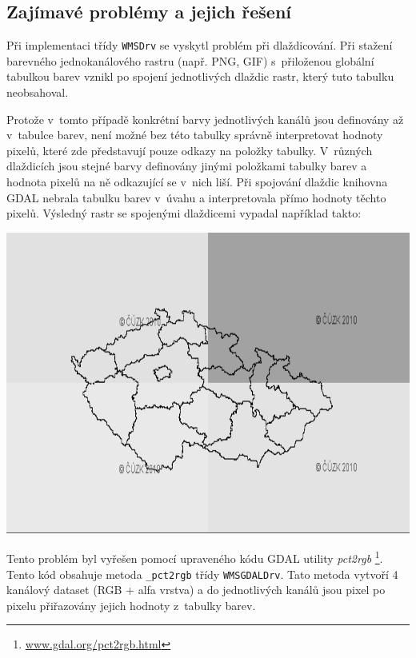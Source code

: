 \documentclass[a4paper,12pt]{article}
\begin{document}
\subsection{Zajímavé problémy a jejich řešení}

Při implementaci třídy {\tt WMSDrv} se vyskytl problém při dlaždicování.
Při stažení barevného jednokanálového rastru (např. PNG, GIF)
s~přiloženou globální tabulkou barev vznikl po spojení jednotlivých
dlaždic rastr, který tuto tabulku neobsahoval.

Protože v~tomto případě konkrétní barvy jednotlivých kanálů jsou
definovány až v~tabulce barev, není možné bez této tabulky správně
interpretovat hodnoty pixelů, které zde představují pouze odkazy na
položky tabulky. V~různých dlaždicích jsou stejné barvy definovány
jinými položkami tabulky barev a hodnota pixelů na ně odkazující se
v~nich liší.  Při spojování dlaždic knihovna GDAL nebrala tabulku barev
v~úvahu a interpretovala přímo hodnoty těchto pixelů. Výsledný rastr
se spojenými dlaždicemi vypadal například takto:

\begin{center}
 \includegraphics[scale=0.4]{figures/color_table_problem.png}
\end{center}

Tento problém byl vyřešen pomocí upraveného kódu GDAL utility
\emph{pct2rgb} \footnote{\url{www.gdal.org/pct2rgb.html}}. Tento kód obsahuje
metoda {\tt \_pct2rgb} třídy {\tt WMSGDALDrv}. Tato metoda vytvoří 4 kanálový
dataset (RGB + alfa vrstva) a do jednotlivých kanálů jsou pixel po
pixelu přiřazovány jejich hodnoty z~tabulky barev.
\end{document}
